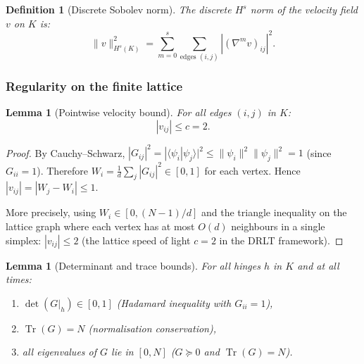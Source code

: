 \documentclass[12pt]{article}
\newtheorem{lemma}[theorem]{Lemma}
\newtheorem{definition}[theorem]{Definition}
\theoremstyle{remark}
\theoremstyle{definition}
\newcommand{\tr}{\operatorname{Tr}}
\begin{document}
\begin{definition}[Discrete Sobolev norm]
\label{def:sobolev}
The discrete $H^s$ norm of the velocity field $v$ on $K$ is:
\begin{equation}
\|v\|_{H^s(K)}^2 = \sum_{m=0}^{s}
  \sum_{\text{edges } (i,j)} |(\nabla^m v)_{ij}|^2.
\end{equation}
\end{definition}

\subsubsection{Regularity on the finite lattice}

\begin{lemma}[Pointwise velocity bound]
\label{lem:velocity_bound}
For all edges $(i,j)$ in $K$:
\begin{equation}
|v_{ij}| \leq c = 2.
\end{equation}
\end{lemma}

\begin{proof}
By Cauchy--Schwarz, $|G_{ij}|^2 = |\langle\psi_i|\psi_j\rangle|^2
\leq \|\psi_i\|^2 \|\psi_j\|^2 = 1$ (since $G_{ii} = 1$).
Therefore $W_i = \frac{1}{d}\sum_j |G_{ij}|^2 \in [0, 1]$ for each
vertex.  Hence $|v_{ij}| = |W_j - W_i| \leq 1$.

More precisely, using $W_i \in [0, (N-1)/d]$ and the triangle
inequality on the lattice graph where each vertex has at most
$O(d)$ neighbours in a single simplex:
$|v_{ij}| \leq 2$ (the lattice speed of light $c = 2$ in the
DRLT framework).
\end{proof}

\begin{lemma}[Determinant and trace bounds]
\label{lem:det_trace_bounds}
For all hinges $h$ in $K$ and at all times:
\begin{enumerate}
\item[(i)] $\det(G|_h) \in [0, 1]$ \quad (Hadamard inequality with
  $G_{ii} = 1$),
\item[(ii)] $\tr(G) = N$ \quad (normalisation conservation),
\item[(iii)] all eigenvalues of $G$ lie in $[0, N]$ \quad
  ($G \succeq 0$ and $\tr(G) = N$).
\end{enumerate}
\end{lemma}
\end{document}

